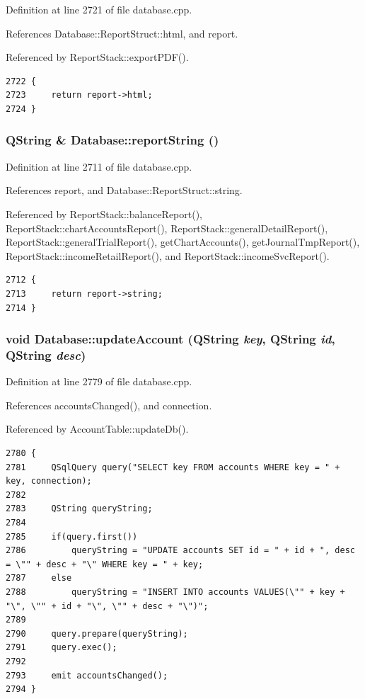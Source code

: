 Definition at line 2721 of file database.cpp.

References Database::Report\-Struct::html, and report.

Referenced by Report\-Stack::export\-PDF().

\footnotesize\begin{verbatim}2722 {
2723     return report->html;
2724 }
\end{verbatim}\normalsize 


\hypertarget{classDatabase_a31}{
\subsubsection[reportString]{\setlength{\rightskip}{0pt plus 5cm}QString \& Database::report\-String ()}}
\label{classDatabase_a31}


Definition at line 2711 of file database.cpp.

References report, and Database::Report\-Struct::string.

Referenced by Report\-Stack::balance\-Report(), Report\-Stack::chart\-Accounts\-Report(), Report\-Stack::general\-Detail\-Report(), Report\-Stack::general\-Trial\-Report(), get\-Chart\-Accounts(), get\-Journal\-Tmp\-Report(), Report\-Stack::income\-Retail\-Report(), and Report\-Stack::income\-Svc\-Report().

\footnotesize\begin{verbatim}2712 {
2713     return report->string;
2714 }
\end{verbatim}\normalsize 


\hypertarget{classDatabase_a39}{
\subsubsection[updateAccount]{\setlength{\rightskip}{0pt plus 5cm}void Database::update\-Account (QString {\em key}, QString {\em id}, QString {\em desc})}}
\label{classDatabase_a39}


Definition at line 2779 of file database.cpp.

References accounts\-Changed(), and connection.

Referenced by Account\-Table::update\-Db().

\footnotesize\begin{verbatim}2780 {
2781     QSqlQuery query("SELECT key FROM accounts WHERE key = " + key, connection);
2782     
2783     QString queryString;
2784     
2785     if(query.first())
2786         queryString = "UPDATE accounts SET id = " + id + ", desc = \"" + desc + "\" WHERE key = " + key;
2787     else
2788         queryString = "INSERT INTO accounts VALUES(\"" + key + "\", \"" + id + "\", \"" + desc + "\")";
2789     
2790     query.prepare(queryString);
2791     query.exec();
2792     
2793     emit accountsChanged();
2794 }
\end{verbatim}\normalsize 


